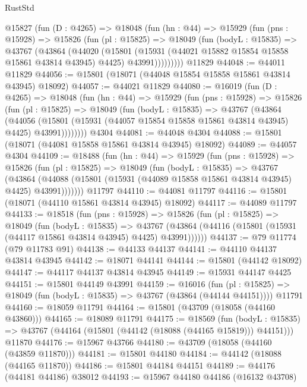 \begin{lexlean}{RustStd}
\begin{coremodule}
    @15827
      (fun (D : @4265) =>
      @18048
        (fun (hn : @44) =>
        @15929
          (fun (pns : @15928) =>
          @15826
            (fun (pl : @15825) =>
            @18049
              (fun (bodyL : @15835) =>
              @43767
                (@43864
                  (@44020
                    (@15801
                      (@15931 (@44021 @15882 @15854 @15858 @15861 @43814 @43945) @4425)
                      @43991)))))))))
    @11829
@44048 := @44011 @11829
@44056 := @15801 (@18071 (@44048 @15854 @15858 @15861 @43814 @43945) @18092)
@44057 := @44021 @11829
@44080 := @16019
    (fun (D : @4265) =>
    @18048
      (fun (hn : @44) =>
      @15929
        (fun (pns : @15928) =>
        @15826
          (fun (pl : @15825) =>
          @18049
            (fun (bodyL : @15835) =>
            @43767
              (@43864
                (@44056
                  (@15801 (@15931 (@44057 @15854 @15858 @15861 @43814 @43945) @4425) @43991))))))))
    @4304
@44081 := @44048 @4304
@44088 := @15801 (@18071 (@44081 @15858 @15861 @43814 @43945) @18092)
@44089 := @44057 @4304
@44109 := @18488
    (fun (hn : @44) =>
    @15929
      (fun (pns : @15928) =>
      @15826
        (fun (pl : @15825) =>
        @18049
          (fun (bodyL : @15835) =>
          @43767
            (@43864
              (@44088 (@15801 (@15931 (@44089 @15858 @15861 @43814 @43945) @4425) @43991)))))))
    @11797
@44110 := @44081 @11797
@44116 := @15801 (@18071 (@44110 @15861 @43814 @43945) @18092)
@44117 := @44089 @11797
@44133 := @18518
    (fun (pns : @15928) =>
    @15826
      (fun (pl : @15825) =>
      @18049
        (fun (bodyL : @15835) =>
        @43767 (@43864 (@44116 (@15801 (@15931 (@44117 @15861 @43814 @43945) @4425) @43991))))))
@44137 := @79 @11774 (@79 @11783 @91)
@44138 := @44133 @44137
@44141 := @44110 @44137 @43814 @43945
@44142 := @18071 @44141
@44144 := @15801 (@44142 @18092)
@44147 := @44117 @44137 @43814 @43945
@44149 := @15931 @44147 @4425
@44151 := @15801 @44149 @43991
@44159 := @16016
    (fun (pl : @15825) => @18049 (fun (bodyL : @15835) => @43767 (@43864 (@44144 @44151))))
    @11791
@44160 := @18059 @11791
@44164 := @15801 (@43709 (@18058 (@44160 @43860)))
@44165 := @18089 @11791
@44175 := @18569
    (fun (bodyL : @15835) => @43767 (@44164 (@15801 (@44142 (@18088 (@44165 @15819))) @44151)))
    @11870
@44176 := @15967 @43766
@44180 := @43709 (@18058 (@44160 (@43859 @11870)))
@44181 := @15801 @44180
@44184 := @44142 (@18088 (@44165 @11870))
@44186 := @15801 @44184 @44151
@44189 := @44176 (@44181 @44186) @38012
@44193 := @15967 @44180 @44186 (@16132 @43708)

\end{coremodule}
\end{lexlean}
